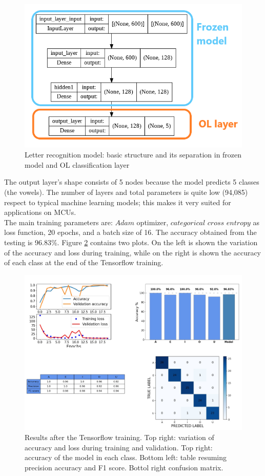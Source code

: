 \documentclass[12pt]{report}
\begin{document}
\begin{figure}[h!]
    \centering
    \includegraphics[width=120mm]{Figures/Chapter4/letter_structure.png} 
    \caption{Letter recognition model: basic structure and its separation in frozen model and OL classification layer}
    \label{fig:letter_structure}    
\end{figure}

The output layer's shape consists of 5 nodes because the model predicts 5 classes (the vowels). The number of layers and total parameters is quite low (94,085) respect to typical machine learning models; this makes it very suited for applications on MCUs. \\
The main training parameters are: $Adam$ optimizer, $categorical$ $cross$ $entropy$ as loss function, 20 epochs, and a batch size of 16. 
The accuracy obtained from the testing is 96.83\%. Figure \ref{fig:training_letters} contains two plots. On the left is shown the variation of the accuracy and loss during training, while on the right is shown the accuracy of each class at the end of the Tensorflow training.\\

\begin{figure}[h!]
    \centering
    \includegraphics[width=130mm]{Figures/Chapter4/training_letters.png} 
    \caption{Results after the Tensorflow training. Top right: variation of accuracy and loss during training and validation. Top right: accuracy of the model in each class. Bottom left: table resuming precision accuracy and F1 score. Bottol right confusion matrix.}
    \label{fig:training_letters}    
\end{figure}
\end{document}
